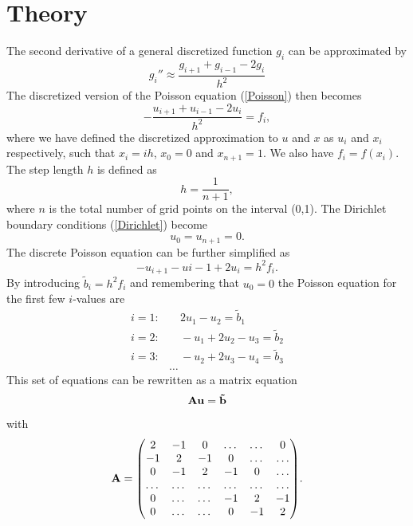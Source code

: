 \documentclass[notitlepage, reprint, nofootinbib]{revtex4-1}
\begin{document}
\section{Theory}
The second derivative of a general discretized function $g_i$ can be approximated by 
\begin{equation}\label{second_derivative} g_i'' \approx \frac{g_{i+1}+g_{i-1}-2g_i}{h^2}\end{equation}
The discretized version of the Poisson equation (\ref{Poisson}) then becomes 
\begin{equation}\label{Poisson_discrete}-\frac{u_{i+1}+u_{i-1}-2u_i}{h^2}=f_i,\end{equation}
where we have defined the discretized approximation to $u$ and $x$ as $u_i$ and $x_i$ respectively, such that $x_i=ih$, $x_0=0$ and $x_{n+1}=1$. We also have $f_i=f(x_i)$. The step length $h$ is defined as 
\begin{equation}\label{step_length}h=\frac{1}{n+1},\end{equation}
where $n$ is the total number of grid points on the interval (0,1). The Dirichlet boundary conditions (\ref{Dirichlet}) become
\begin{equation}\label{Dirichlet2}u_0=u_{n+1}=0.\end{equation}
The discrete Poisson equation can be further simplified as
$$-u_{i+1}-u{i-1}+2u_i=h^2f_i.$$
By introducing $\tilde{b}_i=h^2f_i$ and remembering that $u_0=0$ the Poisson equation for the first few $i$-values are
\begin{align*}
	i=1:&\quad 2u_1-u_2=\tilde{b}_1\\
	i=2:&\quad -u_1+2u_2-u_3=\tilde{b}_2\\
	i=3:&\quad -u_2+2u_3-u_4=\tilde{b}_3\\
	&\dots
\end{align*}
This set of equations can be rewritten as a matrix equation 
\begin{equation}\label{lil_boi}\vb{A}\vb{u}=\vb{\tilde{b}}\end{equation}
with
\begin{equation}\label{big_boi}\vb{A}=\mqty( 2 & -1  & 0 &\dots &\dots &0\\-1&2&-1&0&\dots&\dots\\0&-1&2&-1&0&\dots\\ \dots&\dots&\dots&\dots&\dots&\dots \\ 0&\dots&\dots&-1&2&-1\\ 0&\dots&\dots&0&-1&2 ).\end{equation}
\end{document}
